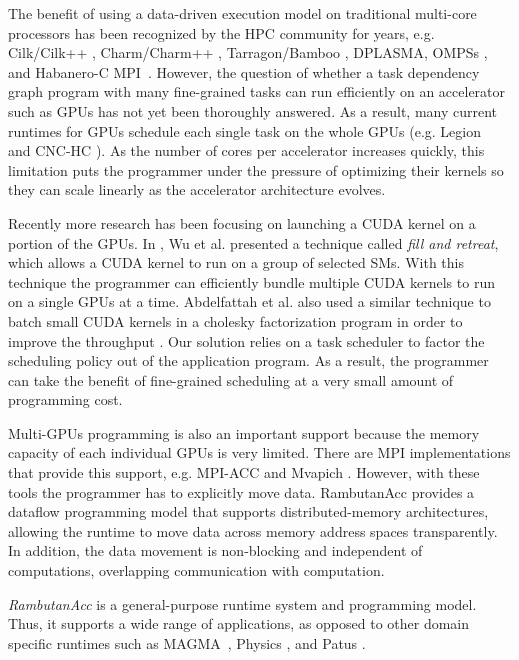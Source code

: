 The benefit of using a data-driven execution model on traditional multi-core processors has been recognized by the HPC community for years, e.g. Cilk/Cilk++ \cite{cilk,BlumofeJoKu95}, Charm/Charm++ \cite{charm++}, Tarragon/Bamboo \cite{cicotti11:dissertation,bamboo, bamboo-LU, bambooThesis}, DPLASMA\cite{dplasma,Bosilca:2012:DAGuE}, OMPSs \cite{ompss,nexus}, and Habanero-C MPI~\cite{Chatterjee:2013:HCMPI}.
However, the question of whether a task dependency graph program with many fine-grained tasks can run efficiently on an accelerator such as GPUs has not yet been thoroughly answered.
As a result, many current runtimes for GPUs schedule each single task on the whole GPUs (e.g. Legion~\cite{legion} and CNC-HC \cite{cnc-hc}).
As the number of cores per accelerator increases quickly, this limitation puts the programmer under the pressure of optimizing their kernels so they can scale linearly as the accelerator architecture evolves.

Recently more research has been focusing on launching a CUDA kernel on a portion of the GPUs.
In \cite{fillNRetreat}, Wu et al. presented a technique called {\em fill and retreat}, which allows a CUDA kernel to run on a group of selected SMs.
With this technique the programmer can efficiently bundle multiple CUDA kernels to run on a single GPUs at a time.
Abdelfattah et al. also used a similar technique to batch small CUDA kernels in a cholesky factorization program in order to improve the throughput \cite{batchedCholesky}.
Our solution relies on a task scheduler to factor the scheduling policy out of the application program.
As a result, the programmer can take the benefit of fine-grained scheduling at a very small amount of programming cost.

Multi-GPUs programming is also an important support because the memory capacity of each individual GPUs is very limited.
There are MPI implementations that provide this support, e.g. MPI-ACC \cite{mpiacc, mpiacc1} and Mvapich \cite{mvapich2gpu}.
However, with these tools the programmer has to explicitly move data.
RambutanAcc provides a dataflow programming model that supports distributed-memory architectures, allowing the runtime to move data across memory address spaces transparently.
In addition, the data movement is non-blocking and independent of computations, overlapping communication with computation.

{\em RambutanAcc} is a general-purpose runtime system and programming model.
Thus, it supports a wide range of applications, as opposed to other domain specific runtimes such as MAGMA~\cite{MAGMA}, Physics \cite{physics}, and Patus \cite{patus}.

